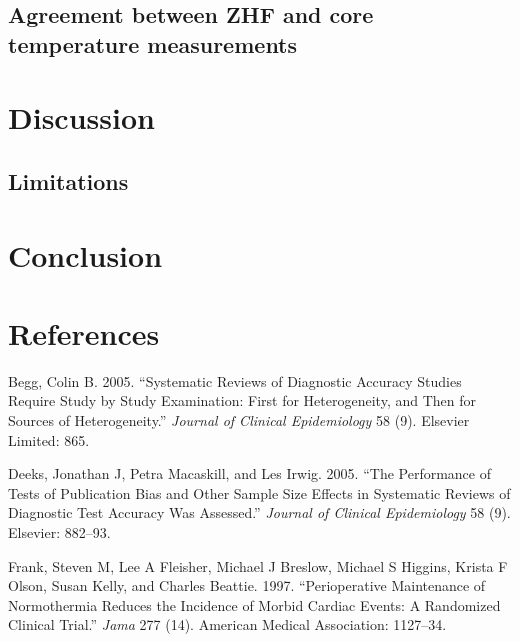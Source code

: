 \documentclass[smallextended]{svjour3}       %
\begin{document}
\hypertarget{agreement-between-zhf-and-core-temperature-measurements}{%
\subsection{Agreement between ZHF and core temperature
measurements}\label{agreement-between-zhf-and-core-temperature-measurements}}

\hypertarget{discussion}{%
\section{Discussion}\label{discussion}}

\hypertarget{limitations}{%
\subsection{Limitations}\label{limitations}}

\hypertarget{conclusion}{%
\section{Conclusion}\label{conclusion}}

\hypertarget{references}{%
\section*{References}\label{references}}

\hypertarget{refs}{}
\leavevmode\hypertarget{ref-begg2005systematic}{}%
Begg, Colin B. 2005. ``Systematic Reviews of Diagnostic Accuracy Studies
Require Study by Study Examination: First for Heterogeneity, and Then
for Sources of Heterogeneity.'' \emph{Journal of Clinical Epidemiology}
58 (9). Elsevier Limited: 865.

\leavevmode\hypertarget{ref-deeks2005performance}{}%
Deeks, Jonathan J, Petra Macaskill, and Les Irwig. 2005. ``The
Performance of Tests of Publication Bias and Other Sample Size Effects
in Systematic Reviews of Diagnostic Test Accuracy Was Assessed.''
\emph{Journal of Clinical Epidemiology} 58 (9). Elsevier: 882--93.

\leavevmode\hypertarget{ref-frank1997perioperative}{}%
Frank, Steven M, Lee A Fleisher, Michael J Breslow, Michael S Higgins,
Krista F Olson, Susan Kelly, and Charles Beattie. 1997. ``Perioperative
Maintenance of Normothermia Reduces the Incidence of Morbid Cardiac
Events: A Randomized Clinical Trial.'' \emph{Jama} 277 (14). American
Medical Association: 1127--34.
\end{document}
